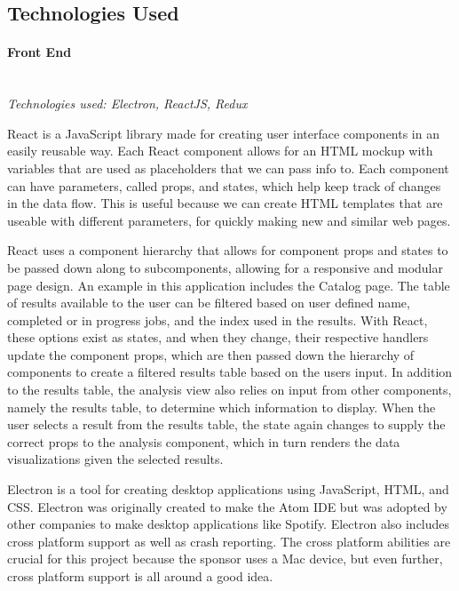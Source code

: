 \subsection{Technologies Used}

\paragraph{Front End} \mbox{} \\
\textit{Technologies used: Electron, ReactJS, Redux}\par
React is a JavaScript library made for creating user interface components in an easily reusable way. Each React component allows for an HTML mockup with variables that are used as placeholders that we can pass info to. Each component can have parameters, called props, and states, which help keep track of changes in the data flow. This is useful because we can create HTML templates that are useable with different parameters, for quickly making new and similar web pages.\par
React uses a component hierarchy that allows for component props and states to be passed down along to subcomponents, allowing for a responsive and modular page design. An example in this application includes the Catalog page. The table of results available to the user can be filtered based on user defined name, completed or in progress jobs, and the index used in the results. With React, these options exist as states, and when they change, their respective handlers update the component props, which are then passed down the hierarchy of components to create a filtered results table based on the user\textquotesingle s input. In addition to the results table, the analysis view also relies on input from other components, namely the results table, to determine which information to display. When the user selects a result from the results table, the state again changes to supply the correct props to the analysis component, which in turn renders the data visualizations given the selected results.\par
Electron is a tool for creating desktop applications using JavaScript, HTML, and CSS. Electron was originally created to make the Atom IDE but was adopted by other companies to make desktop applications like Spotify. Electron also includes cross platform support as well as crash reporting. The cross platform abilities are crucial for this project because the sponsor uses a Mac device, but even further, cross platform support is all around a good idea.\par

